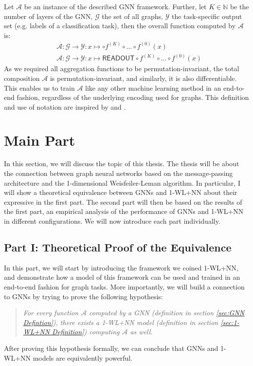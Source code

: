 \documentclass[11pt, dvipsnames, DIV=12]{scrreprt}
\theoremstyle{definition}
\begin{document}
Let $\mathcal{A}$ be an instance of the described GNN framework. Further, let $K \in \mathbb{N}$ be the number of layers of the GNN, $\mathcal{G}$ the set of all graphs, $\mathcal{Y}$ the task-specific output set (e.g. labels of a classification task), then the overall function computed by $\mathcal{A}$ is:
\begin{align}
    &\mathcal{A}: \mathcal{G} \rightarrow \mathcal{Y}: x \mapsto \circ f^{(K)} \circ \ldots \circ f^{(0)}(x)\\
    &\mathcal{A}: \mathcal{G} \rightarrow \mathcal{Y}: x \mapsto \textsf{READOUT} \circ f^{(K)} \circ \ldots \circ f^{(0)}(x)
\end{align}
As we required all aggregation functions to be permutation-invariant, the total composition $\mathcal{A}$ is permutation-invariant, and similarly, it is also differentiable. This enables us to train $\mathcal{A}$ like any other machine learning method in an end-to-end fashion, regardless of the underlying encoding used for graphs. This definition and use of notation are inspired by \cite{Morris2018} and \cite{Xu2018}.


\section{Main Part}
In this section, we will discuss the topic of this thesis. The thesis will be about the connection between graph neural networks based on the message-passing architecture and the 1-dimensional Weisfeiler-Leman algorithm. In particular, I will show a theoretical equivalence between GNNs and 1-WL+NN about their expressive in the first part. The second part will then be based on the results of the first part, an empirical analysis of the performance of GNNs and 1-WL+NN in different configurations. We will now introduce each part individually.

\subsection{Part I: Theoretical Proof of the Equivalence}
In this part, we will start by introducing the framework we coined 1-WL+NN, and demonstrate how a model of this framework can be used and trained in an end-to-end fashion for graph tasks. More importantly, we will build a connection to GNNs by trying to prove the following hypothesis:

\begin{quote}
\textit{
    For every function $\mathcal{A}$ computed by a GNN (definition in section \ref{sec:GNN Defintion}), there exists a 1-WL+NN model (definition in section \ref{sec:1-WL+NN Definition}) computing $\mathcal{A}$ as well.
}
\end{quote}
After proving this hypothesis formally, we can conclude that GNNs and 1-WL+NN models are equivalently powerful. 
\end{document}
